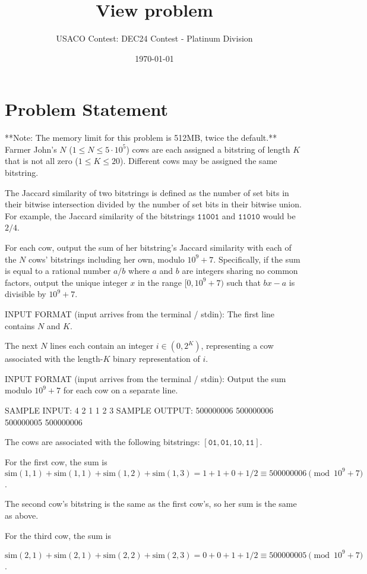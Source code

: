 \documentclass[12pt]{article}
\title{View problem}
\author{USACO Contest: DEC24 Contest - Platinum Division}
\date{\today}
\begin{document}
\maketitle

\section*{Problem Statement}


**Note: The memory limit for this problem is 512MB, twice the default.**
Farmer John's $N$ ($1\le N\le 5\cdot 10^5$) cows are each assigned a  bitstring
of length $K$ that is not all zero ($1\le K\le 20$). Different cows may be
assigned the same bitstring.

The Jaccard similarity of two bitstrings is defined as the number of set bits in
their bitwise intersection divided by the number of set bits in their bitwise union.
For example, the Jaccard similarity of the bitstrings $\texttt{11001}$ and
$\texttt{11010}$ would be $2/4$.

For each cow, output the sum of her bitstring's Jaccard similarity with each of
the $N$ cows' bitstrings including her own, modulo $10^9+7$. Specifically, if
the sum is equal to a rational number $a/b$ where $a$ and $b$ are integers
sharing no common factors, output the unique integer $x$ in the range
$[0,10^9+7)$ such that $bx-a$ is divisible by $10^9+7$.

INPUT FORMAT (input arrives from the terminal / stdin):
The first line contains $N$ and $K$.

The next $N$ lines each contain an integer $i\in (0,2^K)$, representing a cow
associated with the length-$K$ binary representation of $i$.

INPUT FORMAT (input arrives from the terminal / stdin):
Output the sum modulo $10^9+7$ for each cow on a separate line.

SAMPLE INPUT:
4 2
1
1
2
3
SAMPLE OUTPUT: 
500000006
500000006
500000005
500000006

The cows are associated with the following bitstrings:
$[\texttt{01}, \texttt{01}, \texttt{10}, \texttt{11}]$.

For the first cow, the sum is
$\text{sim}(1,1)+\text{sim}(1,1)+\text{sim}(1,2)+\text{sim}(1,3)=1+1+0+1/2\equiv 500000006\pmod{10^9+7}$.

The second cow's bitstring is the same as the first cow's, so her sum is the
same as above.

For the third cow, the sum is

$\text{sim}(2,1)+\text{sim}(2,1)+\text{sim}(2,2)+\text{sim}(2,3)=0+0+1+1/2\equiv 500000005\pmod{10^9+7}$.
\end{document}
